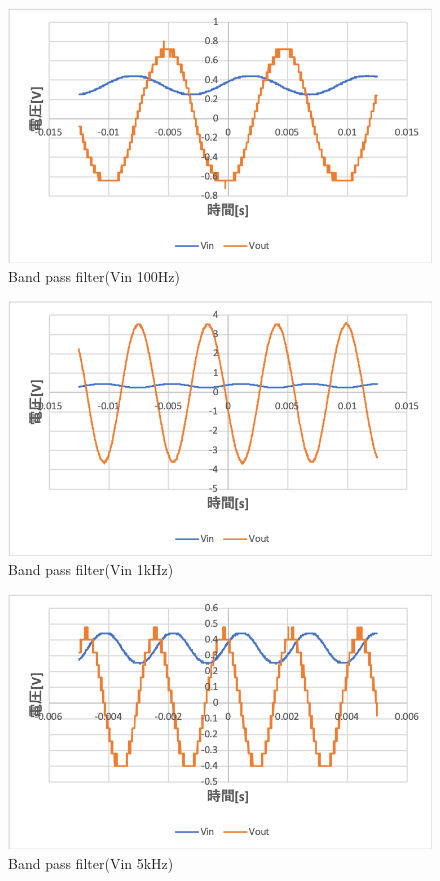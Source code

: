 \documentclass[11pt, a4paper,twocolumn]{jarticle}
\begin{document}
\begin{figure}[htbp]
 \begin{center}
  \includegraphics[width=0.8\linewidth]{fig52.png}
 \end{center}
 \caption{Band pass filter(Vin 100Hz)}
 \label{fig:52}
\end{figure}

\begin{figure}[htbp]
 \begin{center}
  \includegraphics[width=0.8\linewidth]{fig53.png}
 \end{center}
 \caption{Band pass filter(Vin 1kHz)}
 \label{fig:53}
\end{figure}

\begin{figure}[htbp]
 \begin{center}
  \includegraphics[width=0.8\linewidth]{fig54.png}
 \end{center}
 \caption{Band pass filter(Vin 5kHz)}
 \label{fig:54}
\end{figure}
\end{document}
